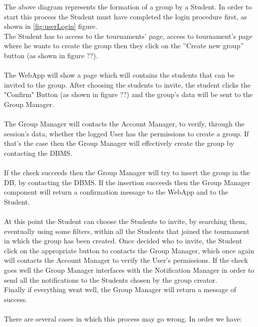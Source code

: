 \documentclass{article}
\begin{document}
{        \newpage
        The above diagram represents the formation of a group by a Student.
        In order to start this process the Student must have completed the login 
        procedure first, as shown in \ref{fig:userLogin} figure.\\  
        The Student has to access to the tournaments' page, access 
        to tournament's page where he wants to create the group then 
        they click on the ”Create new group” button (as shown in figure ??).
        \\ \\
        The WebApp will show a page which will contains the students that can be
        invited to the group. After choosing the students to invite, the student 
        clicks the "Confirm" Button (as shown in figure ??) and the group's data 
        will be sent to the Group Manager.
        \\ \\
        The Group Manager will contacts the Account Manager, to verify, through
        the session’s data, whether the logged User has the permissions to create
        a group. If that’s the case then the Group Manager will effectively create
        the group by contacting the DBMS.
        \\ \\
        If the check succeeds then the Group Manager will try to insert the group
        in the DB, by contacting the DBMS.
        If the insertion succeeds then the Group Manager component will return a confirmation
        message to the WebApp and to the Student.
        \\ \\
        At this point the Student can choose the Students to invite, by searching them, eventually
        using some filters, within all the Students that joined the tournament in which the group
        has been created.
        Once decided who to invite, the Student click on the appropriate button to contacts the
        Group Manager, which once again will contacts the Account Manager to verify the User's 
        permissions. If the check goes well the Group Manager interfaces with the Notification
        Manager in order to send all the notifications to the Students chosen by the group
        creator. \\
        Finally if everything went well, the Group Manager will return a message of success.
        \\ \\
        There are several cases in which this process may go wrong. In order we have:
}
\end{document}
